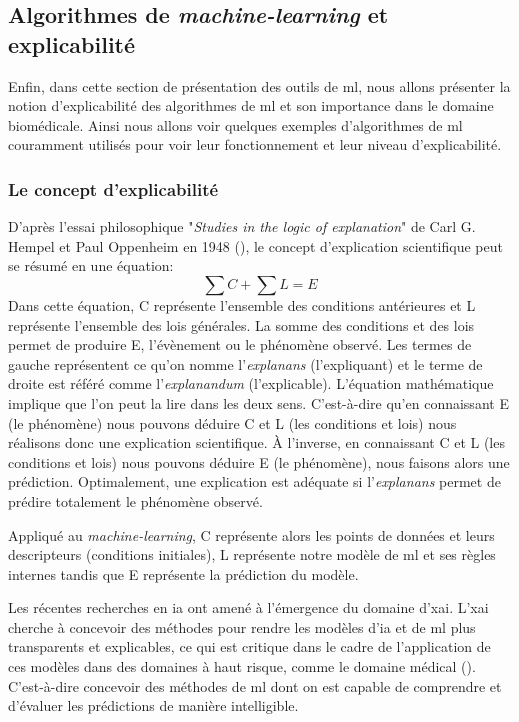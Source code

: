 \subsection{Algorithmes de \textit{machine-learning} et explicabilité}
Enfin, dans cette section de présentation des outils de \gls{ml}, nous allons présenter la notion d'explicabilité des algorithmes de \gls{ml} et son importance dans le domaine biomédicale. Ainsi nous allons voir quelques exemples d'algorithmes de \gls{ml} couramment utilisés pour voir leur fonctionnement et leur niveau d'explicabilité.

\subsubsection{Le concept d'explicabilité}
D'après l'essai philosophique "\textit{Studies in the logic of explanation}" de Carl G. Hempel et Paul Oppenheim en 1948 (\cite{hempel_studies_1948}), le concept d'explication scientifique peut se résumé en une équation:
\[\sum C + \sum L = E\]
Dans cette équation, C représente l'ensemble des conditions antérieures et L représente l'ensemble des lois générales. La somme des conditions et des lois permet de produire E, l'évènement ou le phénomène observé. Les termes de gauche représentent ce qu’on nomme l’\textit{explanans} (l’expliquant) et le terme de droite est référé comme l’\textit{explanandum} (l’explicable). L’équation mathématique implique que l’on peut la lire dans les deux sens. C’est-à-dire qu’en connaissant E (le phénomène) nous pouvons déduire C et L (les conditions et lois) nous réalisons donc une explication scientifique. À l’inverse, en connaissant C et L (les conditions et lois) nous pouvons déduire E (le phénomène), nous faisons alors une prédiction. Optimalement, une explication est adéquate si l’\textit{explanans} permet de prédire totalement le phénomène observé.

Appliqué au \textit{machine-learning}, C représente alors les points de données et leurs descripteurs (conditions initiales), L représente notre modèle de \gls{ml} et ses règles internes tandis que E représente la prédiction du modèle.

Les récentes recherches en \gls{ia} ont amené à l'émergence du domaine d'\gls{xai}. L'\gls{xai} cherche à concevoir des méthodes pour rendre les modèles d'\gls{ia} et de \gls{ml} plus transparents et explicables, ce qui est critique dans le cadre de l'application de ces modèles dans des domaines à haut risque, comme le domaine médical (\cite{arrieta_explainable_2019}). C'est-à-dire concevoir des méthodes de \gls{ml} dont on est capable de comprendre et d'évaluer les prédictions de manière intelligible.

